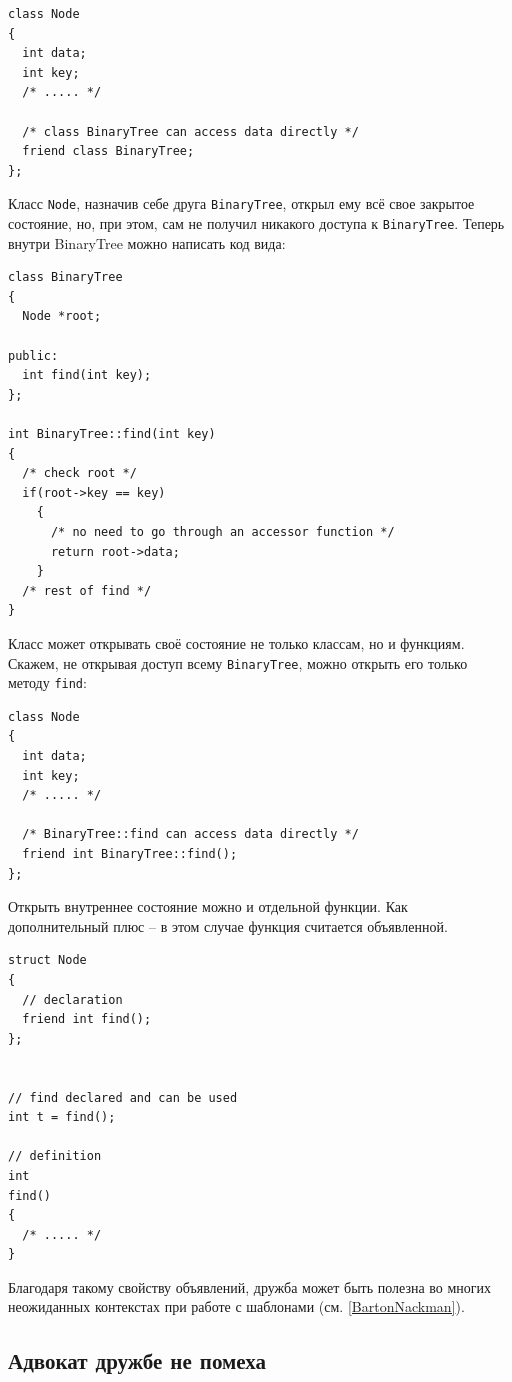 \documentclass[a4paper,12pt,oneside]{book}
\begin{document}
\begin{lstlisting}
class Node
{
  int data;
  int key;
  /* ..... */

  /* class BinaryTree can access data directly */
  friend class BinaryTree; 
};
\end{lstlisting}


Класс \lstinline!Node!, назначив себе друга \lstinline!BinaryTree!, открыл ему всё свое закрытое состояние, но, при этом, сам не получил никакого доступа к \lstinline!BinaryTree!. Теперь внутри BinaryTree можно написать код вида:

\begin{lstlisting}
class BinaryTree
{
  Node *root;

public:
  int find(int key);
};

int BinaryTree::find(int key)
{
  /* check root */
  if(root->key == key)
    {
      /* no need to go through an accessor function */
      return root->data;
    }
  /* rest of find */
}
\end{lstlisting}


Класс может открывать своё состояние не только классам, но и функциям. Скажем, не открывая доступ всему \lstinline!BinaryTree!, можно открыть его только методу \lstinline!find!:

\begin{lstlisting}
class Node
{
  int data;
  int key;
  /* ..... */

  /* BinaryTree::find can access data directly */
  friend int BinaryTree::find();
};
\end{lstlisting}

Открыть внутреннее состояние можно и отдельной функции. Как дополнительный плюс -- в этом случае функция считается объявленной.

\begin{lstlisting}
struct Node
{
  // declaration
  friend int find();
};


// find declared and can be used
int t = find();

// definition
int
find() 
{
  /* ..... */
}
\end{lstlisting}

Благодаря такому свойству объявлений, дружба может быть полезна во многих неожиданных контекстах при работе с шаблонами (см. \ref{BartonNackman}).

\subsection{Адвокат дружбе не помеха}
\end{document}
